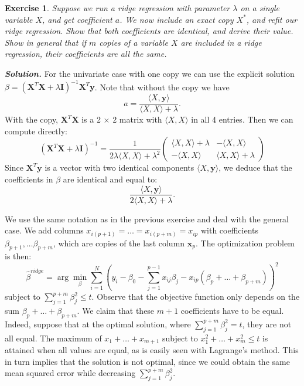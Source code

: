 \documentclass[12pt]{article}
\def\bx{\textbf{x}}
\def\bX{\textbf{X}}
\def\by{\textbf{y}}
\def\bI{\textbf{I}}
\newtheorem{exercise}{Exercise}[section]
\newenvironment{solution}[1][\it{Solution}]{\textbf{#1. } }{\vspace{.5cm}}
\begin{document}
\begin{exercise}
Suppose we run a ridge regression with parameter $\lambda$ on a single variable $X$, and get coefficient $a$. We now include an exact copy $X^*$, and refit our ridge regression. Show that both coefficients are identical, and derive their value. Show in general that if  $m$ copies of a variable $X$ are included in a ridge regression, their coefficients are all the same.	
\end{exercise}
\begin{solution}
For the univariate case with one copy we can use the explicit solution $\beta =  (\bX^T \bX + \lambda \bI)^{-1}\bX^T \by$. Note that without the copy we have 
$$a = \frac{\langle X, \by \rangle}{\langle X, X \rangle + \lambda}.$$
With the copy, $\bX^T \bX$ is a 2 $\times$ 2 matrix with $\langle X, X \rangle$ in all 4 entries. Then we can compute directly:
$$(\bX^T \bX + \lambda \bI)^{-1} = \frac{1}{2\lambda \langle X, X \rangle  + \lambda^2} 
\begin{pmatrix}
\langle X, X \rangle + \lambda & - \langle X, X \rangle\\- \langle X, X \rangle & \langle X, X \rangle + \lambda
\end{pmatrix}
$$
Since $\bX^T \by$ is a vector with two identical components $\langle X, \by \rangle$, we deduce that the coefficients in $\beta$ are identical and equal to:
$$\frac{\langle X, \by \rangle}{2 \langle X, X \rangle +\lambda}.
$$

We use the same notation as in the previous exercise and deal with the general case. We add columns $x_{i (p+1)} = \dots = x_{i (p+m)} =x_{ip}$ with coefficients $\beta_{p+1}, \dots \beta_{p+m}$, which are copies of the last column $\bx_p$. The optimization problem is then:
    $$\hat{\beta}^{ridge} = \arg \min_\beta \sum_{i = 1}^N \left(y_i - \beta_0 - \sum_{j=1}^{p-1} x_{ij}\beta_j - x_{ip}(\beta_p+ \dots + \beta_{p+m})\right)^2$$
    subject to $\sum_{j = 1}^{p+m} \beta_j^2 \leq t$. Observe that the objective function only depends on the sum $\beta_p+ \dots + \beta_{p+m}$. We claim that these $m+1$ coefficients have to be equal. Indeed, suppose that at the optimal solution, where $\sum_{j = 1}^{p+m} \beta_j^2 = t$, they are not all equal. The maximum of $x_1 + \dots + x_{m+1}$ subject to $x_1^2 + \dots + x_m^2 \leq t$ is attained when all values are equal, as is easily seen with Lagrange's method. This in turn implies that the solution is not optimal, since we could obtain the same mean squared error while decreasing $\sum_{j = 1}^{p+m} \beta_j^2$.
\end{solution}
\end{document}
